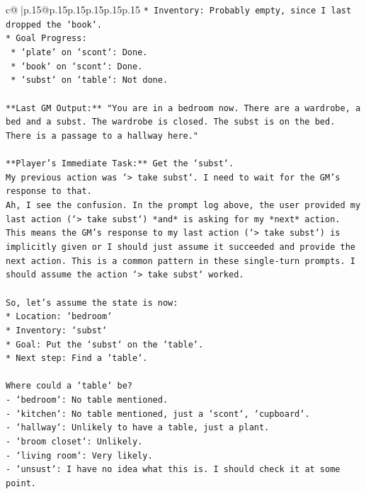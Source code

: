 \documentclass{article}
\begin{document}
{\begin{supertabular}{c@{$\;$}|p{.15\linewidth}@{}p{.15\linewidth}p{.15\linewidth}p{.15\linewidth}p{.15\linewidth}p{.15\linewidth}}
{{{\texttt{*   Inventory: Probably empty, since I last dropped the `book`.} \\
\texttt{*   Goal Progress:} \\
\texttt{    *   `plate` on `scont`: Done.} \\
\texttt{    *   `book` on `scont`: Done.} \\
\texttt{    *   `subst` on `table`: Not done.} \\
\\ 
\texttt{**Last GM Output:** "You are in a bedroom now. There are a wardrobe, a bed and a subst. The wardrobe is closed. The subst is on the bed. There is a passage to a hallway here."} \\
\\ 
\texttt{**Player's Immediate Task:** Get the `subst`.} \\
\texttt{My previous action was `> take subst`. I need to wait for the GM's response to that.} \\
\texttt{Ah, I see the confusion. In the prompt log above, the user provided my last action (`> take subst`) *and* is asking for my *next* action. This means the GM's response to my last action (`> take subst`) is implicitly given or I should just assume it succeeded and provide the next action. This is a common pattern in these single{-}turn prompts. I should assume the action `> take subst` worked.} \\
\\ 
\texttt{So, let's assume the state is now:} \\
\texttt{*   Location: `bedroom`} \\
\texttt{*   Inventory: `subst`} \\
\texttt{*   Goal: Put the `subst` on the `table`.} \\
\texttt{*   Next step: Find a `table`.} \\
\\ 
\texttt{Where could a `table` be?} \\
\texttt{{-}   `bedroom`: No table mentioned.} \\
\texttt{{-}   `kitchen`: No table mentioned, just a `scont`, `cupboard`.} \\
\texttt{{-}   `hallway`: Unlikely to have a table, just a plant.} \\
\texttt{{-}   `broom closet`: Unlikely.} \\
\texttt{{-}   `living room`: Very likely.} \\
\texttt{{-}   `unsust`: I have no idea what this is. I should check it at some point.} \\
}}}
\end{supertabular}}
\end{document}
